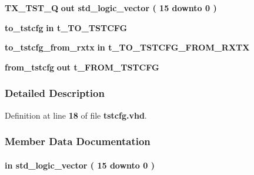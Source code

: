 \begin{DoxyCompactItemize}
\item 
{\bf T\+X\+\_\+\+T\+S\+T\+\_\+Q}  {\bfseries {\bfseries \textcolor{keywordflow}{out}\textcolor{vhdlchar}{ }}} {\bfseries \textcolor{comment}{std\+\_\+logic\+\_\+vector}\textcolor{vhdlchar}{ }\textcolor{vhdlchar}{(}\textcolor{vhdlchar}{ }\textcolor{vhdlchar}{ } \textcolor{vhdldigit}{15} \textcolor{vhdlchar}{ }\textcolor{keywordflow}{downto}\textcolor{vhdlchar}{ }\textcolor{vhdlchar}{ } \textcolor{vhdldigit}{0} \textcolor{vhdlchar}{ }\textcolor{vhdlchar}{)}\textcolor{vhdlchar}{ }} 
\item 
{\bf to\+\_\+tstcfg}  {\bfseries {\bfseries \textcolor{keywordflow}{in}\textcolor{vhdlchar}{ }}} {\bfseries {\bfseries {\bf t\+\_\+\+T\+O\+\_\+\+T\+S\+T\+C\+FG}} \textcolor{vhdlchar}{ }} 
\item 
{\bf to\+\_\+tstcfg\+\_\+from\+\_\+rxtx}  {\bfseries {\bfseries \textcolor{keywordflow}{in}\textcolor{vhdlchar}{ }}} {\bfseries {\bfseries {\bf t\+\_\+\+T\+O\+\_\+\+T\+S\+T\+C\+F\+G\+\_\+\+F\+R\+O\+M\+\_\+\+R\+X\+TX}} \textcolor{vhdlchar}{ }} 
\item 
{\bf from\+\_\+tstcfg}  {\bfseries {\bfseries \textcolor{keywordflow}{out}\textcolor{vhdlchar}{ }}} {\bfseries {\bfseries {\bf t\+\_\+\+F\+R\+O\+M\+\_\+\+T\+S\+T\+C\+FG}} \textcolor{vhdlchar}{ }} 
\end{DoxyCompactItemize}


\subsubsection{Detailed Description}


Definition at line {\bf 18} of file {\bf tstcfg.\+vhd}.



\subsubsection{Member Data Documentation}
\paragraph[{A\+D\+F\+\_\+\+C\+NT}]{ {\bfseries \textcolor{keywordflow}{in}\textcolor{vhdlchar}{ }} {\bfseries \textcolor{comment}{std\+\_\+logic\+\_\+vector}\textcolor{vhdlchar}{ }\textcolor{vhdlchar}{(}\textcolor{vhdlchar}{ }\textcolor{vhdlchar}{ } \textcolor{vhdldigit}{15} \textcolor{vhdlchar}{ }\textcolor{keywordflow}{downto}\textcolor{vhdlchar}{ }\textcolor{vhdlchar}{ } \textcolor{vhdldigit}{0} \textcolor{vhdlchar}{ }\textcolor{vhdlchar}{)}\textcolor{vhdlchar}{ }} \hspace{0.3cm}{\ttfamily [Port]}}\label{clasststcfg_ab0663187cf7383a5d6983dca800cb329}


